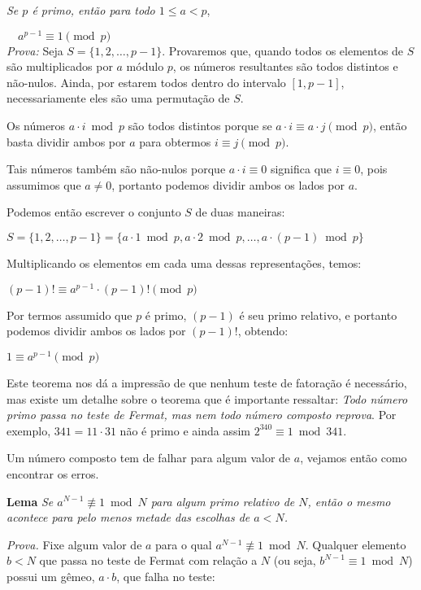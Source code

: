 \textit{Se $p$ é primo, então para todo $1 \leq a < p$},

$\quad a^{p-1} \equiv 1 \pmod p$\\


\textit{Prova:} Seja $S = \{1,2,\ldots,p-1\}$. Provaremos que, quando todos os
elementos de $S$ são multiplicados por $a$ módulo $p$, os números resultantes
são todos distintos e não-nulos. Ainda, por estarem todos dentro do intervalo
$[1,p-1]$, necessariamente eles são uma permutação de $S$.

Os números $a\cdot i\bmod p$ são todos distintos porque se $a\cdot i \equiv
a\cdot j \pmod p$, então basta dividir ambos por $a$ para obtermos $i\equiv j
\pmod p$.

Tais números também são não-nulos porque $a\cdot i \equiv 0$ significa que
$i\equiv 0$, pois assumimos que $a \ne 0$, portanto podemos dividir ambos os
lados por $a$.

Podemos então escrever o conjunto $S$ de duas maneiras:

$S = \{1,2,\ldots,p-1\} = \{a\cdot1 \bmod p, a\cdot2\bmod p,\ldots,
a\cdot(p-1)\bmod p\}$

Multiplicando os elementos em cada uma dessas representações, temos:

$(p-1)! \equiv a^{p-1} \cdot (p-1)! \pmod p$

Por termos assumido que $p$ é primo, $(p-1)$ é seu primo relativo, e portanto
podemos dividir ambos os lados por $(p-1)!$, obtendo:

$1 \equiv  a^{p-1} \pmod p$
\vspace{1.2em}

Este teorema nos dá a impressão de que nenhum teste de fatoração é necessário,
mas existe um detalhe sobre o teorema que é importante ressaltar: \textit{Todo
número primo passa no teste de Fermat, mas nem todo número composto reprova}.
Por exemplo, $341 = 11 \cdot 31$ não é primo e ainda assim $2^{340} \equiv 1
\bmod 341$.

Um número composto tem de falhar para algum valor de $a$, vejamos então como
encontrar os erros.

\textbf{Lema} \textit{Se $a^{N-1} \not\equiv 1 \bmod N$ para algum primo
relativo de $N$, então o mesmo acontece para pelo menos metade das escolhas
de $a < N$.}

\textit{Prova.} Fixe algum valor de $a$ para o qual $a^{N-1}\not\equiv 1 \bmod
N$. Qualquer elemento $b < N$ que passa no teste de Fermat com relação a $N$
(ou seja, $b^{N-1} \equiv 1 \bmod N$) possui um gêmeo, $a\cdot b$, que falha
no teste:

